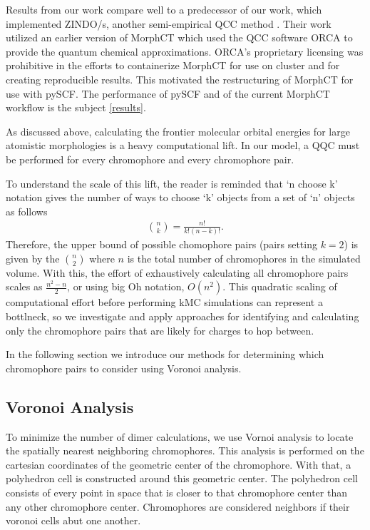 Results from our work compare well to a predecessor of our work, which implemented ZINDO/s, another
semi-empirical QCC method \cite{Miller2018a}\cite{jones2017}. 
Their work utilized an earlier version of MorphCT which used the QCC software 
ORCA \cite{Neese2012b} to provide the quantum chemical approximations. 
ORCA's proprietary licensing was prohibitive in the efforts to containerize MorphCT for use on cluster and for
creating reproducible results. This motivated the restructuring of MorphCT for use with pySCF. The
performance of pySCF and of the current MorphCT workflow is the subject \autoref{results}.

As discussed above, calculating the frontier molecular orbital energies for large atomistic morphologies is
a heavy computational lift. 
In our model, a QQC must be performed for every chromophore and every chromophore pair. 

To understand the scale of this lift, the reader is reminded that
`n choose k' notation gives the number of ways to choose `k' objects from a set of 
`n' objects as follows 
\begin{align}
    {n \choose k} =  \frac{n!}{k!(n-k)!}.
\end{align}
Therefore, the upper bound of possible chomophore pairs (pairs setting $k=2$) is given by the 
$n \choose 2$ where $n$ is the total number of chromophores in the simulated volume. 
With this, the effort of exhaustively calculating all chromophore pairs scales as $\frac{n^{2} - n}{2}$, or using big Oh notation, $O(n^2)$.
This quadratic scaling of computational effort before performing kMC simulations can represent a bottlneck, so we investigate and apply approaches for identifying and calculating only the chromophore pairs that are likely for charges to hop between.

In the following section we introduce our methods for determining
which chromophore pairs to consider using Voronoi analysis. 

\subsection{Voronoi Analysis}

To minimize the number of dimer calculations, we use Vornoi analysis to locate the spatially
nearest neighboring chromophores. This analysis is performed on the cartesian coordinates of
the geometric center of the chromophore. With that, a polyhedron cell is constructed around this geometric
center. The polyhedron cell consists of every point in space that is closer to that chromophore center than
any other chromophore center. Chromophores are considered neighbors if their voronoi cells abut one another.

